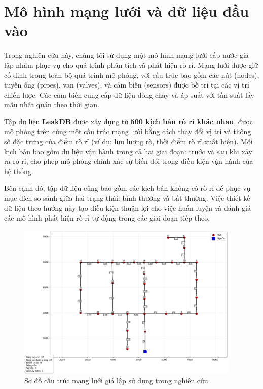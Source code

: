 \section{Mô hình mạng lưới và dữ liệu đầu vào}

Trong nghiên cứu này, chúng tôi sử dụng một mô hình mạng lưới cấp nước giả lập nhằm phục vụ cho quá trình phân tích và phát hiện rò rỉ. Mạng lưới được giữ cố định trong toàn bộ quá trình mô phỏng, với cấu trúc bao gồm các nút (nodes), tuyến ống (pipes), van (valves), và cảm biến (sensors) được bố trí tại các vị trí chiến lược. Các cảm biến cung cấp dữ liệu dòng chảy và áp suất với tần suất lấy mẫu nhất quán theo thời gian.

Tập dữ liệu \textbf{LeakDB} được xây dựng từ \textbf{500 kịch bản rò rỉ khác nhau}, được mô phỏng trên cùng một cấu trúc mạng lưới bằng cách thay đổi vị trí và thông số đặc trưng của điểm rò rỉ (ví dụ: lưu lượng rò, thời điểm rò rỉ xuất hiện). Mỗi kịch bản bao gồm dữ liệu vận hành trong cả hai giai đoạn: trước và sau khi xảy ra rò rỉ, cho phép mô phỏng chính xác sự biến đổi trong điều kiện vận hành của hệ thống.

Bên cạnh đó, tập dữ liệu cũng bao gồm các kịch bản không có rò rỉ để phục vụ mục đích so sánh giữa hai trạng thái: bình thường và bất thường. Việc thiết kế dữ liệu theo hướng này tạo điều kiện thuận lợi cho việc huấn luyện và đánh giá các mô hình phát hiện rò rỉ tự động trong các giai đoạn tiếp theo.

\begin{figure}[H]
    \centering
    \includegraphics[width=0.95\textwidth]{image/section5_3/hanoi_network.png}
    \caption{Sơ đồ cấu trúc mạng lưới giả lập sử dụng trong nghiên cứu}
    \label{fig:network_diagram}
\end{figure}

